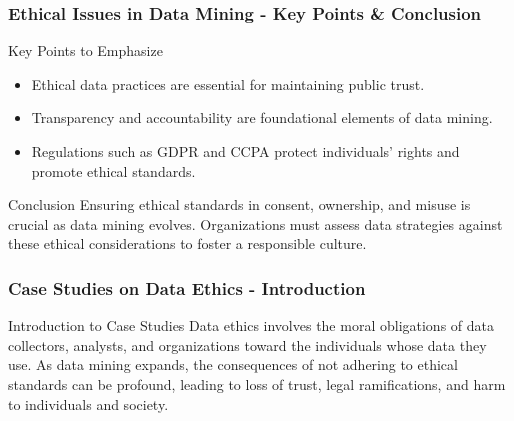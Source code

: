 \documentclass[aspectratio=169]{beamer}
\begin{document}
\begin{frame}[fragile]
  \frametitle{Ethical Issues in Data Mining - Key Points & Conclusion}
  \begin{block}{Key Points to Emphasize}
    \begin{itemize}
      \item Ethical data practices are essential for maintaining public trust.
      \item Transparency and accountability are foundational elements of data mining.
      \item Regulations such as GDPR and CCPA protect individuals' rights and promote ethical standards.
    \end{itemize}
  \end{block}
  
  \begin{block}{Conclusion}
    Ensuring ethical standards in consent, ownership, and misuse is crucial as data mining evolves. 
    Organizations must assess data strategies against these ethical considerations to foster a responsible culture.
  \end{block}
\end{frame}

\begin{frame}[fragile]
  \frametitle{Case Studies on Data Ethics - Introduction}
  \begin{block}{Introduction to Case Studies}
    Data ethics involves the moral obligations of data collectors, analysts, and organizations toward the individuals whose data they use. As data mining expands, the consequences of not adhering to ethical standards can be profound, leading to loss of trust, legal ramifications, and harm to individuals and society.
  \end{block}
\end{frame}
\end{document}

